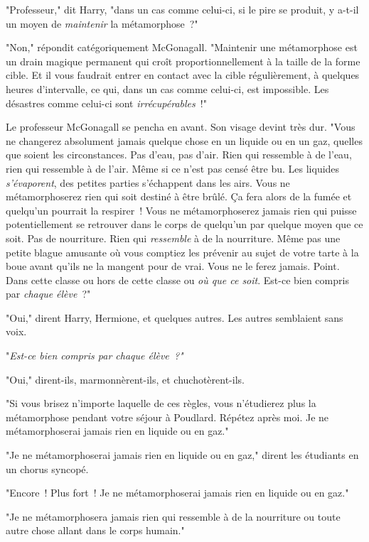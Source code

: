 "Professeur," dit Harry, "dans un cas comme celui-ci, si le pire se produit, y a-t-il un moyen de \emph{maintenir} la métamorphose~?"

"Non," répondit catégoriquement McGonagall. "Maintenir une métamorphose est un drain magique permanent qui croît proportionnellement à la taille de la forme cible. Et il vous faudrait entrer en contact avec la cible régulièrement, à quelques heures d'intervalle, ce qui, dans un cas comme celui-ci, est impossible. Les désastres comme celui-ci sont \emph{irrécupérables}~!"

Le professeur McGonagall se pencha en avant. Son visage devint très dur. "Vous ne changerez absolument jamais quelque chose en un liquide ou en un gaz, quelles que soient les circonstances. Pas d'eau, pas d'air. Rien qui ressemble à de l'eau, rien qui ressemble à de l'air. Même si ce n'est pas censé être bu. Les liquides \emph{s'évaporent}, des petites parties s'échappent dans les airs. Vous ne métamorphoserez rien qui soit destiné à être brûlé. Ça fera alors de la fumée et quelqu'un pourrait la respirer~! Vous ne métamorphoserez jamais rien qui puisse potentiellement se retrouver dans le corps de quelqu'un par quelque moyen que ce soit. Pas de nourriture. Rien qui \emph{ressemble} à de la nourriture. Même pas une petite blague amusante où vous comptiez les prévenir au sujet de votre tarte à la boue avant qu'ils ne la mangent pour de vrai. Vous ne le ferez jamais. Point. Dans cette classe ou hors de cette classe ou \emph{où que ce soit}. Est-ce bien compris par \emph{chaque élève}~?"

"Oui," dirent Harry, Hermione, et quelques autres. Les autres semblaient sans voix.

"\emph{Est-ce bien compris par chaque élève~?"}

"Oui," dirent-ils, marmonnèrent-ils, et chuchotèrent-ils.

"Si vous brisez n'importe laquelle de ces règles, vous n'étudierez plus la métamorphose pendant votre séjour à Poudlard. Répétez après moi. Je ne métamorphoserai jamais rien en liquide ou en gaz."

"Je ne métamorphoserai jamais rien en liquide ou en gaz," dirent les étudiants en un chorus syncopé.

"Encore~! Plus fort~! Je ne métamorphoserai jamais rien en liquide ou en gaz."

"Je ne métamorphosera jamais rien qui ressemble à de la nourriture ou toute autre chose allant dans le corps humain."

